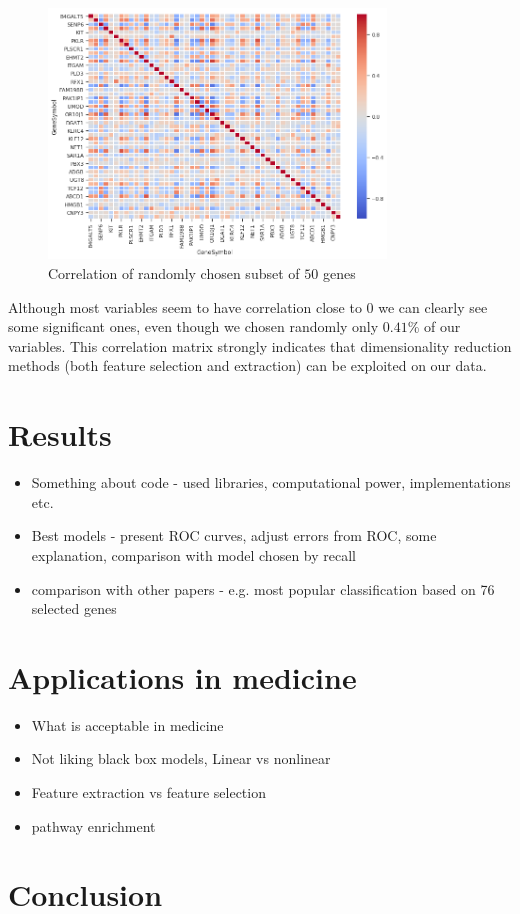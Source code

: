 \documentclass[12pt, wide]{mwart}
\begin{document}
\begin{figure}
\centering
\includegraphics[width=0.8\textwidth]{images/heatmap.png}
\caption{Correlation of randomly chosen subset of $50$ genes}
\label{fig:heatmap}
\end{figure}

Although most variables seem to have correlation close to $0$ we can clearly see some significant ones, even though we chosen randomly only $0.41$\% of our variables. This correlation matrix strongly indicates that dimensionality reduction methods (both feature selection and extraction) can be exploited on our data.

\section{Results}

\begin{itemize}
    \item Something about code - used libraries, computational power, implementations etc.
    \item Best models - present ROC curves, adjust errors from ROC, some explanation, comparison with model chosen by recall
    \item comparison with other papers - e.g. most popular classification based on 76 selected genes
\end{itemize}


\section{Applications in medicine}

\begin{itemize}
    \item What is acceptable in medicine
    \item Not liking black box models, Linear vs nonlinear
    \item Feature extraction vs feature selection
    \item pathway enrichment
\end{itemize}

\section{Conclusion}



%
\end{document}
